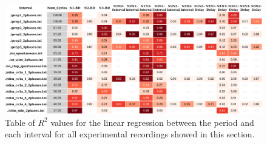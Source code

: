 \begin{figure}
	\includegraphics[width=\textwidth]{./img/invariants/styled_table_invariants_r-squared.pdf}
	\caption{Table of $R^2$ values for the linear regression between the period and each interval for all experimental recordings showed in this section.}
	\label{fig:R2 table}
\end{figure}
